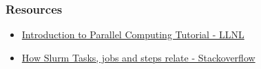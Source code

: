\documentclass{beamer}
\newcommand{\code}[1]{\colorbox{codegray}{\texttt{#1}}}
\begin{document}




%
%
%
%
%
%


\begin{frame}
\frametitle{Resources}
\begin{itemize}
    \item \href{https://hpc.llnl.gov/documentation/tutorials/introduction-parallel-computing-tutorial}{\color{blue}Introduction to Parallel Computing Tutorial - LLNL}
    \item \href{https://stackoverflow.com/a/46532581/4021436}{\color{blue}How Slurm Tasks, jobs and steps relate - Stackoverflow}
    \bigskip
\end{itemize}
\end{frame}
\end{document}
